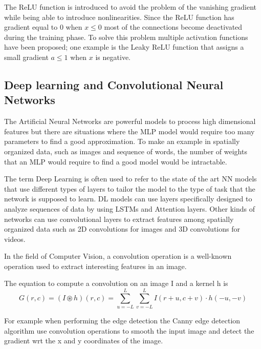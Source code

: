 \documentclass[../main.tex]{subfiles}
\begin{document}
The ReLU function is introduced to avoid the problem of the vanishing gradient while being able to introduce nonlinearities. Since the ReLU function has gradient equal to $0$ when $x\le 0$ most of the connections become deactivated during the training phase. To solve this problem multiple activation functions have been proposed; one example is the Leaky ReLU function that assigns a small gradient $a\leq 1$ when $x$ is negative.

\subsection{Deep learning and Convolutional Neural Networks}

The Artificial Neural Networks are powerful models to process high dimensional features but there are situations where the MLP model would require too many parameters to find a good approximation. To make an example in spatially organized data, such as images and sequence of words, the number of weights that an MLP would require to find a good model would be intractable.

The term Deep Learning is often used to refer to the state of the art NN models that use different types of layers to tailor the model to the type of task that the network is supposed to learn.
DL models can use layers specifically designed to analyze sequences of data by using LSTMs and Attention layers. 
Other kinds of networks can use convolutional layers to extract features among spatially organized data such as 2D convolutions for images and 3D convolutions for videos.

In the field of Computer Vision, a convolution operation is a well-known operation used to extract interesting features in an image. 

The equation to compute a convolution on an image I and a kernel h is
\begin{equation}
 G(r,c) = (I \circledast h)(r,c) = \sum_{u=-L}^L \sum_{v=-L}^{L} I(r+u,c+v) \cdot h(-u, -v)
\end{equation}

For example when performing the edge detection the Canny edge detection algorithm use convolution operations to smooth the input image and detect the gradient wrt the x and y coordinates of the image. 
\end{document}
